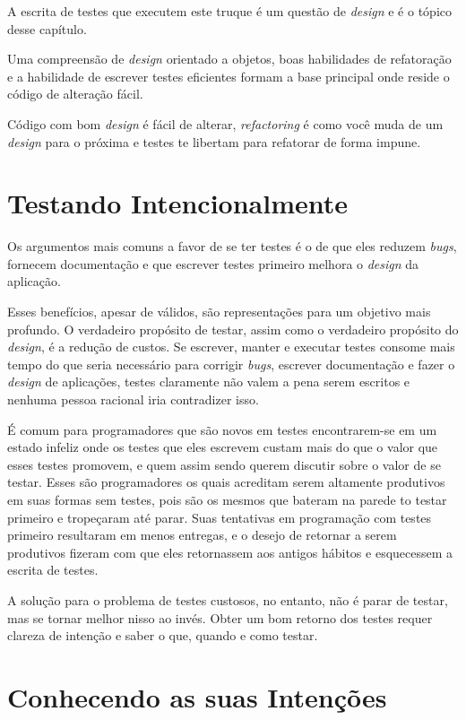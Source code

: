 A escrita de testes que executem este truque é um questão de \textit{design} e é o tópico desse capítulo.

Uma compreensão de \textit{design} orientado a objetos, boas habilidades de refatoração e a habilidade de escrever testes eficientes formam a base principal onde reside o código de alteração fácil.

Código com bom \textit{design} é fácil de alterar, \textit{refactoring} é como você muda de um \textit{design} para o próxima e testes te libertam para refatorar de forma impune. 

\section{Testando Intencionalmente}

Os argumentos mais comuns a favor de se ter testes é o de que eles reduzem \textit{bugs}, fornecem documentação e que escrever testes primeiro melhora o \textit{design} da aplicação.

Esses benefícios, apesar de válidos, são representações para um objetivo mais profundo. O verdadeiro propósito de testar, assim como o verdadeiro propósito do \textit{design}, é a redução de custos. Se escrever, manter e executar testes consome mais tempo do que seria necessário para corrigir \textit{bugs}, escrever documentação e fazer o \textit{design} de aplicações, testes claramente não valem a pena serem escritos e nenhuma pessoa racional iria contradizer isso.

É comum para programadores que são novos em testes encontrarem-se em um estado infeliz onde os testes que eles escrevem custam mais do que o valor que esses testes promovem, e quem assim sendo querem discutir sobre o valor de se testar. Esses são programadores os quais acreditam serem altamente produtivos em suas formas sem testes, pois são os mesmos que bateram na parede to testar primeiro e tropeçaram até parar. Suas tentativas em programação com testes primeiro resultaram em menos entregas, e o desejo de retornar a serem produtivos fizeram com que eles retornassem aos antigos hábitos e esquecessem a escrita de testes.

A solução para o problema de testes custosos, no entanto, não é parar de testar, mas se tornar melhor nisso ao invés. Obter um bom retorno dos testes requer clareza de intenção e saber o que, quando e como testar.

\section{Conhecendo as suas Intenções}

